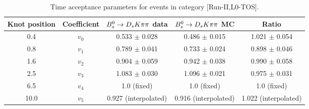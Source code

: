 \begin{table}[hp!]
\centering
\small
\caption{Time acceptance parameters for events in category [\textsf{Run-II},\textsf{L0-TOS}].}
\begin{tabular}{c c c c c}
\hline
\hline
Knot position & Coefficient & ${{B}^0_{s}}\rightarrow{\ensuremath{{D}_{s}}}{\ensuremath{K}}{\ensuremath{\pi}}{\ensuremath{\pi}}$ data & ${{B}^0_{s}}\rightarrow{\ensuremath{{D}_{s}}}{\ensuremath{K}}{\ensuremath{\pi}}{\ensuremath{\pi}}$ MC & Ratio \\
\hline
0.4 & $v_{0}$ & 0.533 $\pm$ 0.028 & 0.486 $\pm$ 0.015 & 1.021 $\pm$ 0.054\\
0.8 & $v_{1}$ & 0.789 $\pm$ 0.041 & 0.733 $\pm$ 0.024 & 0.898 $\pm$ 0.046\\
1.6 & $v_{2}$ & 0.904 $\pm$ 0.059 & 0.942 $\pm$ 0.038 & 0.990 $\pm$ 0.058\\
2.5 & $v_{3}$ & 1.083 $\pm$ 0.030 & 1.096 $\pm$ 0.021 & 0.975 $\pm$ 0.031\\
6.5 & $v_{4}$ &  1.0 (fixed) & 1.0 (fixed) & 1.0 (fixed)\\
10.0 & $v_{5}$ & 0.927 (interpolated) & 0.916 (interpolated) & 1.022 (interpolated) \\
\hline
\hline
\end{tabular}
\label{table:splines}
\end{table}
